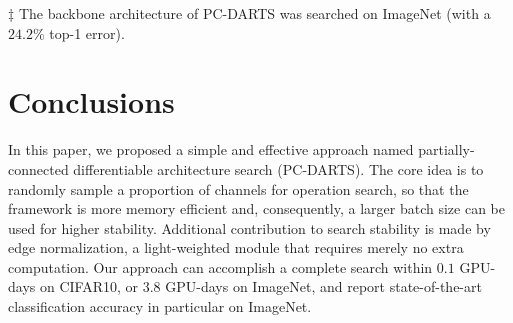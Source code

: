 \documentclass{article} \usepackage{iclr2020_conference,times}
\begin{document}
\begin{table}[!t]
\centering
\caption{Detection results, in terms of average precisions, on the MS-COCO dataset (test-dev 2015).}
\label{table:detection}
\begin{threeparttable}[b]
\begin{tablenotes}
\item[$\ddagger$] {\footnotesize The backbone architecture of PC-DARTS was searched on ImageNet (with a $24.2\%$ top-1 error).}
\end{tablenotes}\end{threeparttable}
\end{table}
\section{Conclusions}
\label{Conclusions}

In this paper, we proposed a simple and effective approach named partially-connected differentiable architecture search (PC-DARTS). The core idea is to randomly sample a proportion of channels for operation search, so that the framework is more memory efficient and, consequently, a larger batch size can be used for higher stability. Additional contribution to search stability is made by edge normalization, a light-weighted module that requires merely no extra computation. Our approach can accomplish a complete search within $0.1$ GPU-days on CIFAR10, or $3.8$ GPU-days on ImageNet, and report state-of-the-art classification accuracy in particular on ImageNet.
\end{document}
